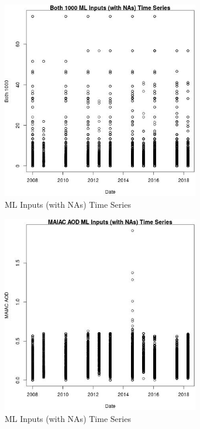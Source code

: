\begin{figure} 
\centering  
\includegraphics[width=0.77\textwidth]{Code_Outputs/Report_ML_input_PM25_Step4_part_e_de_duplicated_aves_compiled_2019-05-18wNAs_Both_1000vDate.jpg} 
\caption{\label{fig:Report_ML_input_PM25_Step4_part_e_de_duplicated_aves_compiled_2019-05-18wNAsBoth_1000vDate}ML Inputs (with NAs) Time Series} 
\end{figure} 
 

\begin{figure} 
\centering  
\includegraphics[width=0.77\textwidth]{Code_Outputs/Report_ML_input_PM25_Step4_part_e_de_duplicated_aves_compiled_2019-05-18wNAs_MAIAC_AODvDate.jpg} 
\caption{\label{fig:Report_ML_input_PM25_Step4_part_e_de_duplicated_aves_compiled_2019-05-18wNAsMAIAC_AODvDate}ML Inputs (with NAs) Time Series} 
\end{figure} 
 

